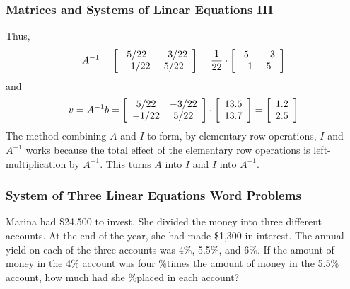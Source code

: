 \documentclass[xcolor=dvipsnames]{beamer}
\begin{document}
\begin{frame}
  \frametitle{Matrices and Systems of Linear Equations III}
Thus,
\begin{equation}
  \label{eq:oogeujie}
  A^{-1}=\left[\begin{array}{cc}
 5/22  & -3/22 \\
 -1/22 & 5/22
               \end{array}\right]=\frac{1}{22}\cdot\left[
               \begin{array}{cc}
                 5 & -3 \\
                 -1 & 5
               \end{array}\right]\notag
\end{equation}
and
\begin{equation}
  \label{eq:seeleeje}
  v=A^{-1}b=\left[\begin{array}{cc}
 5/22  & -3/22 \\
 -1/22 & 5/22
  \end{array}\right]\cdot
\left[\begin{array}{c}
 13.5   \\
 13.7  
  \end{array}\right]=\left[\begin{array}{c}
 1.2   \\
 2.5  
  \end{array}\right]\notag
\end{equation}
The method combining $A$ and $I$ to form, by elementary row
operations, $I$ and $A^{-1}$ works because the total effect of the
elementary row operations is left-multiplication by $A^{-1}$. This
turns $A$ into $I$ and $I$ into $A^{-1}$. 
\end{frame}


\begin{frame}
  \frametitle{System of Three Linear Equations Word Problems}
  {\ubung} Marina had \$24,500 to invest. She divided the money into
  three different accounts. At the end of the year, she had made
  \$1,300 in interest. The annual yield on each of the three accounts
  was 4\%, 5.5\%, and 6\%. If the amount of money in the 4\% account
  was four \%times the amount of money in the 5.5\% account, how much
  had she \%placed in each account?
\end{frame}
\end{document}

